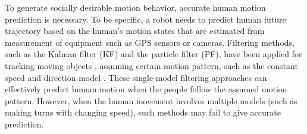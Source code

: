 \documentclass[letterpaper, 10 pt, conference]{ieeeconf}
\newcommand{\todonote}[1]{\vspace{0px} %
	\todo[inline, color=green!30]{\textbf{[Note:]} {#1}} %
}
\newcommand{\todohere}[1]{\hl{(\textbf{TODO:} #1)}}
\begin{document}
	To generate socially desirable motion behavior, accurate human motion prediction is necessary.
	To be specific, a robot needs to predict human future trajectory based on the human's motion states that are estimated from measurement of equipment such as GPS sensors or cameras.
	Filtering methods, such as the Kalman filter (KF) and the particle filter (PF), have been applied for tracking moving objects \cite {koller1994robust,rui2001better}, assuming certain motion pattern, such as the constant speed and direction model \cite{svenstrup2010trajectory,bruce2004better}.
	These single-model filtering approaches can effectively predict human motion when the people follow the assumed motion pattern.
	However, when the human movement involves multiple models (such as making turns with changing speed), such methods may fail to give accurate prediction.
	
	
\end{document}

